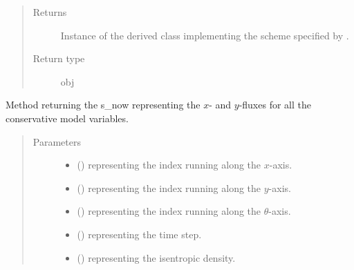 \documentclass[letterpaper,10pt,english]{sphinxmanual}
\begin{document}
\begin{fulllineitems}
\begin{fulllineitems}
\begin{quote}
\begin{description}
\begin{itemize}
\end{itemize}

\item[{Returns}] \leavevmode
Instance of the derived class implementing the scheme specified by .

\item[{Return type}] \leavevmode
obj

\end{description}\end{quote}

\end{fulllineitems}


\begin{fulllineitems}
\label{\detokenize{api:dycore.flux_isentropic.FluxIsentropic.get_horizontal_fluxes}}
Method returning the s\_now representing the \(x\)- and \(y\)-fluxes
for all the conservative model variables.
\begin{quote}\begin{description}
\item[{Parameters}] \leavevmode\begin{itemize}
\item {} 
 () \textendash{}  representing the index running along the \(x\)-axis.

\item {} 
 () \textendash{}  representing the index running along the \(y\)-axis.

\item {} 
 () \textendash{}  representing the index running along the \(\theta\)-axis.

\item {} 
 () \textendash{}  representing the time step.

\item {} 
 () \textendash{}  representing the isentropic density.


\end{itemize}
\end{description}
\end{quote}
\end{fulllineitems}
\end{fulllineitems}
\end{document}
